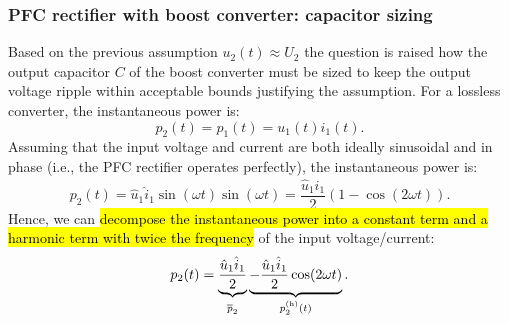 \begin{frame}
    \frametitle{PFC rectifier with boost converter: capacitor sizing}
    Based on the previous assumption $u_2(t)\approx U_2$ the question is raised how the output capacitor $C$ of the boost converter must be sized to keep the output voltage ripple within acceptable bounds justifying the assumption. For a lossless converter, the instantaneous power is:
    \begin{equation*}
        p_2(t) =p_1(t) = u_1(t)i_1(t).
    \end{equation*}\pause
    Assuming that the input voltage and  current are both ideally sinusoidal and in phase (i.e., the PFC rectifier operates perfectly), the instantaneous power is:
    \begin{equation}
        p_2(t) = \hat{u}_1\hat{i}_1\sin(\omega t)\sin(\omega t) = \frac{\hat{u}_1\hat{i}_1}{2}\left(1-\cos(2\omega t)\right).
    \end{equation}\pause
    Hence, we can \hl{decompose the instantaneous power into a constant term and a harmonic term with twice the frequency} of the input voltage/current:
    \begin{equation}
        p_2(t) = \underbrace{\frac{\hat{u}_1\hat{i}_1}{2}}_{\overline{p}_2\vphantom{p_2^{(\mathrm{h})}}} \underbrace{- \frac{\hat{u}_1\hat{i}_1}{2}\cos(2\omega t)}_{p_2^{(\mathrm{h})}(t)}.
    \end{equation}
\end{frame}

